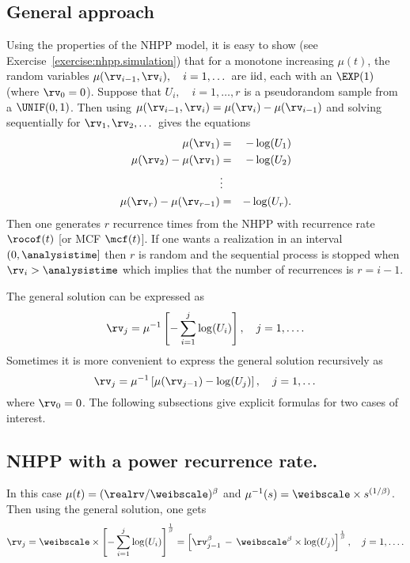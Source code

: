 \subsection{General approach}
Using the properties of the NHPP model, it is easy to show (see
Exercise~\ref{exercise:nhpp.simulation}) that for a monotone
increasing $\mu(t)$, the random variables $
\mu(\rv_{i-1}, \rv_{i}), \quad i=1, \dots
$ are ${\rm iid}$, each with an $\EXP(1)$ (where $\rv_{0} =
0$).  Suppose that $U_{i}, \quad i=1, \dots, r$ is a pseudorandom
sample from a $\UNIF(0,1)$. Then using $\mu(\rv_{i-1},
\rv_{i})=\mu(\rv_{i})-\mu(\rv_{i-1})$ and solving sequentially for
$\rv_{1}, \rv_{2}, \dots$ gives the equations
\begin{eqnarray*}
\mu(\rv_{1})&=&-\log(U_{1})
\\
\mu(\rv_{2})-\mu(\rv_{1})&=&-\log(U_{2})
\\
& \vdots &
\\
\mu(\rv_{r})-\mu(\rv_{r-1})&=&-\log(U_{r}).
\end{eqnarray*}
Then one generates $r$ recurrence times from the NHPP with
recurrence rate
$\rocof(t)$ [or MCF $\mcf(t)$]. If one wants a realization in an
interval $(0,
\analysistime]$ then $r$ is random and the sequential process is
stopped when $\rv_{i}>\analysistime$ which implies that the
number of recurrences is $r=i-1$.

The general solution can be expressed as
\begin{displaymath}
\rv_{j}=\mu^{-1} \left[-\sum_{i=1}^{j}\log(U_{i}) \right], \quad j=1,
\dots .
\end{displaymath}
Sometimes it is more convenient to express the general
solution recursively as
\begin{displaymath}
\rv_{j}=\mu^{-1} \left[\mu(\rv_{j-1})-\log(U_{j}) \right], \quad j=1,
\dots 
\end{displaymath}
where $\rv_{0}=0$. The following subsections give explicit formulas for two 
cases of interest.

\subsection{NHPP with a power recurrence rate.}
In this case $\mu(t)=(\realrv/\weibscale )^{\beta}$ and
$\mu^{-1}(s)=\weibscale \times s^{(1/\beta)}$. Then using the 
general solution, one gets
\begin{displaymath}
\rv_{j}=\weibscale \times 
	  \left [
	  -\sum_{i=1}^{j} \log(U_{i})
	  \right ]^{\frac{1}{\beta}}
=\left [ 
	  \rv_{j-1}^{\beta} \,-\,
	  \weibscale^{\beta} \times \log(U_{j})
	  \right ]^{\frac{1}{\beta}}, \quad j=1, \dots .
\end{displaymath}



